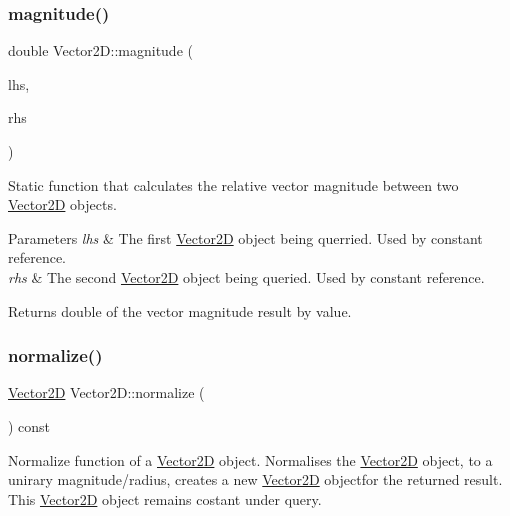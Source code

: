 \subsubsection{\texorpdfstring{magnitude()}{magnitude()}\hspace{0.1cm}{\footnotesize\ttfamily [2/2]}}
{\footnotesize\ttfamily double Vector2\+D\+::magnitude (\begin{DoxyParamCaption}\item[{const \hyperlink{class_vector2_d}{Vector2D} \&}]{lhs,  }\item[{const \hyperlink{class_vector2_d}{Vector2D} \&}]{rhs }\end{DoxyParamCaption})\hspace{0.3cm}{\ttfamily [static]}}



Static function that calculates the relative vector magnitude between two \hyperlink{class_vector2_d}{Vector2D} objects. 


\begin{DoxyParams}{Parameters}
{\em lhs} & The first \hyperlink{class_vector2_d}{Vector2D} object being querried. Used by constant reference. \\
\hline
{\em rhs} & The second \hyperlink{class_vector2_d}{Vector2D} object being queried. Used by constant reference. \\
\hline
\end{DoxyParams}
\begin{DoxyReturn}{Returns}
double of the vector magnitude result by value. 
\end{DoxyReturn}
\mbox{\label{class_vector2_d_a79cfa577c38cb866d088166d6729a47d}} 
\subsubsection{\texorpdfstring{normalize()}{normalize()}}
{\footnotesize\ttfamily \hyperlink{class_vector2_d}{Vector2D} Vector2\+D\+::normalize (\begin{DoxyParamCaption}{ }\end{DoxyParamCaption}) const}



Normalize function of a \hyperlink{class_vector2_d}{Vector2D} object. Normalises the \hyperlink{class_vector2_d}{Vector2D} object, to a unirary magnitude/radius, creates a new \hyperlink{class_vector2_d}{Vector2D} objectfor the returned result. This \hyperlink{class_vector2_d}{Vector2D} object remains costant under query. 

